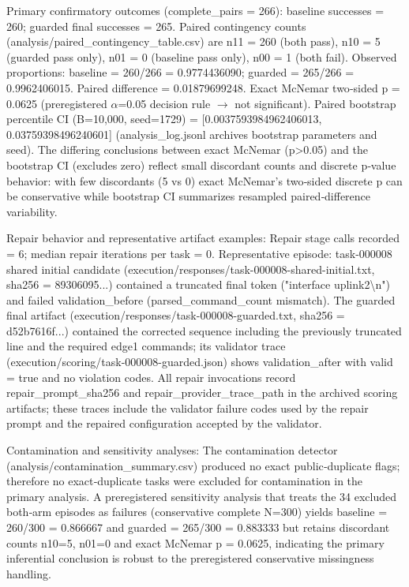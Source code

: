 \documentclass[conference]{IEEEtran}
\begin{document}
Primary confirmatory outcomes (complete\_pairs = 266): baseline successes = 260; guarded final successes = 265. Paired contingency counts (analysis/paired\_contingency\_table.csv) are n11 = 260 (both pass), n10 = 5 (guarded pass only), n01 = 0 (baseline pass only), n00 = 1 (both fail). Observed proportions: baseline = 260/266 = 0.9774436090; guarded = 265/266 = 0.9962406015. Paired difference = 0.01879699248. Exact McNemar two‑sided p = 0.0625 (preregistered \ensuremath{\alpha}=0.05 decision rule \ensuremath{\rightarrow} not significant). Paired bootstrap percentile CI (B=10,000, seed=1729) = [0.0037593984962406013, 0.03759398496240601] (analysis\_log.jsonl archives bootstrap parameters and seed). The differing conclusions between exact McNemar (p>0.05) and the bootstrap CI (excludes zero) reflect small discordant counts and discrete p‑value behavior: with few discordants (5 vs 0) exact McNemar's two‑sided discrete p can be conservative while bootstrap CI summarizes resampled paired‑difference variability.

Repair behavior and representative artifact examples: Repair stage calls recorded = 6; median repair iterations per task = 0. Representative episode: task-000008 shared initial candidate (execution/responses/task-000008-shared-initial.txt, sha256 = 89306095...) contained a truncated final token ("interface uplink2\textbackslash{}n") and failed validation\_before (parsed\_command\_count mismatch). The guarded final artifact (execution/responses/task-000008-guarded.txt, sha256 = d52b7616f...) contained the corrected sequence including the previously truncated line and the required edge1 commands; its validator trace (execution/scoring/task-000008-guarded.json) shows validation\_after with valid = true and no violation codes. All repair invocations record repair\_prompt\_sha256 and repair\_provider\_trace\_path in the archived scoring artifacts; these traces include the validator failure codes used by the repair prompt and the repaired configuration accepted by the validator.

Contamination and sensitivity analyses: The contamination detector (analysis/contamination\_summary.csv) produced no exact public‑duplicate flags; therefore no exact‑duplicate tasks were excluded for contamination in the primary analysis. A preregistered sensitivity analysis that treats the 34 excluded both‑arm episodes as failures (conservative complete N=300) yields baseline = 260/300 = 0.866667 and guarded = 265/300 = 0.883333 but retains discordant counts n10=5, n01=0 and exact McNemar p = 0.0625, indicating the primary inferential conclusion is robust to the preregistered conservative missingness handling.
\end{document}

